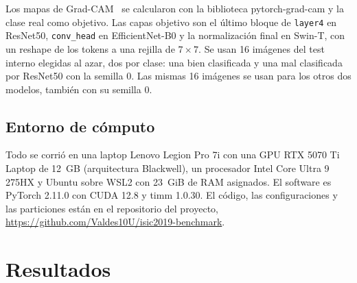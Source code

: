 \documentclass[conference]{IEEEtran}
\begin{document}
Los mapas de Grad-CAM~\cite{selvaraju2017gradcam} se calcularon con la biblioteca pytorch-grad-cam y la clase real como objetivo. Las capas objetivo son el último bloque de \texttt{layer4} en ResNet50, \texttt{conv\_head} en EfficientNet-B0 y la normalización final en Swin-T, con un reshape de los tokens a una rejilla de $7\times7$. Se usan 16 imágenes del test interno elegidas al azar, dos por clase: una bien clasificada y una mal clasificada por ResNet50 con la semilla 0. Las mismas 16 imágenes se usan para los otros dos modelos, también con su semilla 0.

\subsection{Entorno de cómputo}

Todo se corrió en una laptop Lenovo Legion Pro 7i con una GPU RTX 5070 Ti Laptop de 12~GB (arquitectura Blackwell), un procesador Intel Core Ultra 9 275HX y Ubuntu sobre WSL2 con 23~GiB de RAM asignados. El software es PyTorch 2.11.0 con CUDA 12.8 y timm 1.0.30. El código, las configuraciones y las particiones están en el repositorio del proyecto, \url{https://github.com/Valdes10U/isic2019-benchmark}.

\section{Resultados}
\end{document}
